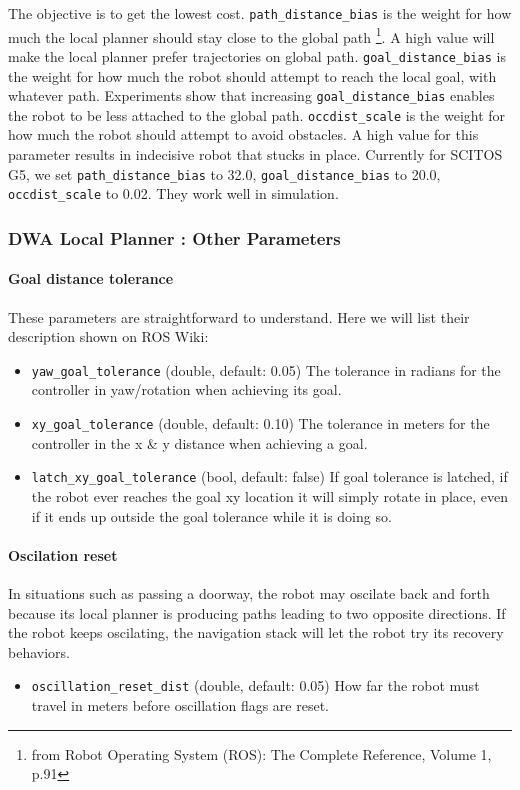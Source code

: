 \documentclass[12pt]{article}
\begin{document}
\normalsize
\noindent The objective is to get the lowest cost. \texttt{path\_distance\_bias} is the weight for how much the local planner should stay close to the global path \footnote{from Robot Operating System (ROS): The Complete Reference, Volume 1, p.91}. A high value will make the local planner prefer trajectories
on global path. \noindent \texttt{goal\_distance\_bias} is the weight for how much the robot should attempt to reach the local goal, with whatever path. Experiments show that increasing \texttt{goal\_distance\_bias}
enables the robot to be less attached to the global path. \texttt{occdist\_scale} is the weight for how much the robot should attempt to avoid obstacles. A high value for this
parameter results in indecisive robot that stucks in place. Currently for SCITOS G5, we set \texttt{path\_distance\_bias} to 32.0, \texttt{goal\_distance\_bias} to 20.0, \texttt{occdist\_scale} to 0.02. They work well in simulation.

\newpage
\subsubsection{DWA Local Planner : Other Parameters}

\paragraph{Goal distance tolerance} These parameters are straightforward to understand. Here we will list their description shown on ROS Wiki:

\begin{itemize}
    \item \texttt{yaw\_goal\_tolerance} (double, default: 0.05)
    The tolerance in radians for the controller in yaw/rotation when achieving its goal.
    \item \texttt{xy\_goal\_tolerance} (double, default: 0.10)
    The tolerance in meters for the controller in the x \& y distance when achieving a goal.
    \item \texttt{latch\_xy\_goal\_tolerance} (bool, default: false) If goal tolerance is latched, if the robot ever reaches the goal xy location it will simply rotate in place, even if it ends up outside the goal tolerance while it is doing so.
\end{itemize}
    
\paragraph{Oscilation reset} In situations such as passing a doorway, the robot may oscilate back and forth because its local planner is producing paths leading to two opposite directions. If the robot keeps oscilating, the navigation stack will let the robot try its recovery behaviors.
\begin{itemize}
    \item \texttt{oscillation\_reset\_dist} (double, default: 0.05) How far the robot must travel in meters before oscillation flags are reset.
\end{itemize}
\end{document}
